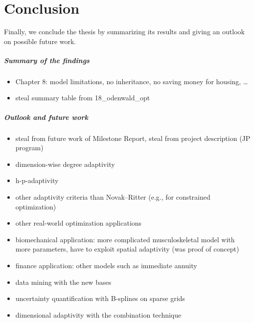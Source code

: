 \chapter{Conclusion}
\label{chap:90conclusion}

\noindent
Finally, we conclude the thesis by summarizing its results
and giving an outlook on possible future work.

\paragraph{Summary of the findings}


\begin{itemize}
  \item
  Chapter 8: model limitations, no inheritance,
  no saving money for housing, \dots
  
  \item
  steal summary table from 18\_odenwald\_opt
\end{itemize}

\dummytext[6]{}

\paragraph{Outlook and future work}


\begin{itemize}
  \item
  steal from future work of Milestone Report,
  steal from project description (JP program)
  
  \item
  dimension-wise degree adaptivity
  
  \item
  h-p-adaptivity
  
  \item
  other adaptivity criteria than Novak--Ritter
  (e.g., for constrained optimization)
  
  \item
  other real-world optimization applications
  
  \item
  biomechanical application: more complicated musculoskeletal model
  with more parameters, have to exploit spatial adaptivity
  (was proof of concept)
  
  \item
  finance application: other models such as immediate annuity
  
  \item
  data mining with the new bases
  
  \item
  uncertainty quantification with B-splines on sparse grids
  
  \item
  dimensional adaptivity with the combination technique
\end{itemize}

\dummytext[6]{}

\cleardoublepage
